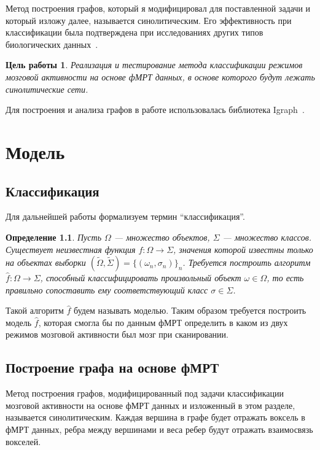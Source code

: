 \documentclass[specialist,
substylefile = spbu_report.rtx,
subf,href,colorlinks=true, 12pt]{disser}
\newtheorem{defenition}{Определение}
\newtheorem*{purpose*}{Цель работы}
\begin{document}
			Метод построения графов, который я модифицировал для поставленной задачи и который изложу далее, называется синолитическим. Его эффективность при классификации была подтверждена при исследованиях других типов биологических данных~\cite{DemichevV2022, Krivonosov2020}.						
		
			\begin{purpose*}
				Реализация и тестирование метода классификации режимов мозговой активности на основе фМРТ данных, в основе которого будут лежать синолитические сети.
			\end{purpose*}
		
			Для построения и анализа графов в работе использовалась библиотека Igraph~\cite{Gabor2006}.				
		
	\chapter{Модель}	
		\section{Классификация}
		Для дальнейшей работы формализуем термин “классификация”. 
		\begin{defenition}
			Пусть $\Omega$ --- множество объектов, $\Sigma$ --- множество классов. Существует неизвестная функция $f: \Omega \rightarrow \Sigma$, значения которой известны только на объектах выборки $(\widetilde{\Omega}, \widetilde{\Sigma}) =  \{(\omega_{n}, \sigma_{n})\}_n$. Требуется построить алгоритм $\widehat{f}: \Omega \rightarrow \Sigma$, способный классифицировать произвольный объект $\omega \in \Omega$, то есть правильно сопоставить ему соответствующий класс $\sigma \in \Sigma$.
		\end{defenition}
		
		Такой алгоритм $\widehat{f}$ будем называть моделью. Таким образом требуется построить модель $\widehat{f}$, которая смогла бы по данным фМРТ определить в каком из двух режимов мозговой активности был мозг при сканировании.								
		
		\section{Построение графа на основе фМРТ}
			Метод построения графов, модифицированный под задачи классификации мозговой активности на основе фМРТ данных и изложенный в этом разделе, называется синолитическим. Каждая вершина в графе будет отражать воксель в фМРТ данных, ребра между вершинами и веса ребер будут отражать взаимосвязь вокселей. 		
			
\end{document}
